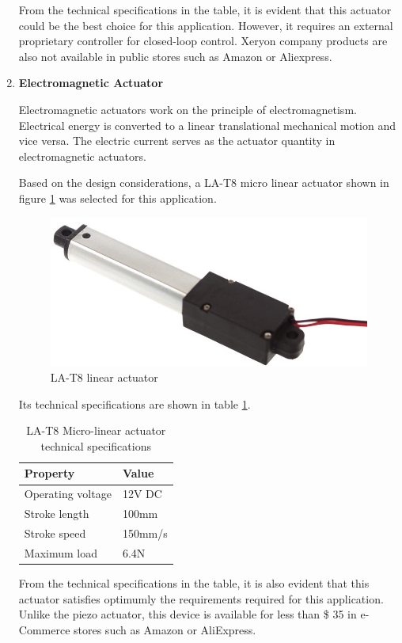 \begin{enumerate}
    
    From the technical specifications in the table, it is evident that this actuator could be the best choice for this application. However, it requires an external proprietary controller for closed-loop control. Xeryon company products are also not available in public stores such as Amazon or Aliexpress.
    
    \item \textbf{Electromagnetic Actuator}
    \par
    Electromagnetic actuators work on the principle of electromagnetism. Electrical energy is converted to a linear translational mechanical motion and vice versa. The electric current serves as the actuator quantity in electromagnetic actuators.
    \par
    Based on the design considerations, a LA-T8 micro linear actuator shown in figure \ref{fig:la_t8_linear_actuator}  was selected for this application.
    \begin{figure}[H]
        \centering
        \includegraphics[width=.25\textwidth, height=.25\textheight]{Figures/LA-T8.jpg}
        \caption[LA-T8 linear actuator]{LA-T8 linear actuator \cite{la_t8}}
        \label{fig:la_t8_linear_actuator}
    \end{figure}
    Its technical specifications are shown in table \ref{tab:la_t8_tab}.
    \begin{table}[H]
    \centering
       \caption[LA-T8 Micro-linear actuator technical specifications]{LA-T8 Micro-linear actuator technical specifications \cite{la_t8}}
    \begin{tabular}{|l|l|}
    \hline
    \textbf{Property} & \textbf{Value} \\ \hline
    Operating voltage & 12V DC \\ \hline
    Stroke length & 100mm \\ \hline
    Stroke speed & 150mm/s \\ \hline
    Maximum load & 6.4N \\ \hline
    \end{tabular}
    
    \label{tab:la_t8_tab}
    \end{table}
    From the technical specifications in the table, it is also evident that this actuator satisfies optimumly the requirements required for this application. Unlike the piezo actuator, this device is available for less than \$ 35 in e-Commerce stores such as Amazon or AliExpress.
\end{enumerate}
